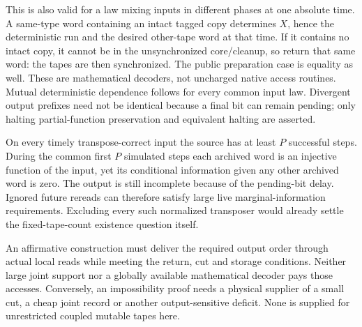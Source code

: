 \begin{informalproof}
This is also valid for a law mixing inputs in different phases at one absolute
time. A same-type word containing an intact tagged copy determines $X$, hence
the deterministic run and the desired other-tape word at that time. If it
contains no intact copy, it cannot be in the unsynchronized core/cleanup, so
return that same word: the tapes are then synchronized. The public preparation
case is equality as well. These are mathematical decoders, not uncharged
native access routines. Mutual deterministic dependence follows for every
common input law. Divergent output prefixes need not be identical because a
final bit can remain pending; only halting partial-function preservation and
equivalent halting are asserted.
\end{informalproof}

On every timely transpose-correct input the source has at least $P$ successful
steps. During the common first $P$ simulated steps each archived word is an
injective function of the input, yet its conditional information given any
other archived word is zero. The output is still incomplete because of the
pending-bit delay. Ignored future rereads can therefore satisfy large live
marginal-information requirements. Excluding every such normalized transposer
would already settle the fixed-tape-count existence question itself.

An affirmative construction must deliver the required output order through
actual local reads while meeting the return, cut and storage conditions.
Neither large joint support nor a globally available mathematical decoder
pays those accesses. Conversely, an impossibility proof needs a physical
supplier of a small cut, a cheap joint record or another output-sensitive
deficit. None is supplied for unrestricted coupled mutable tapes here.
